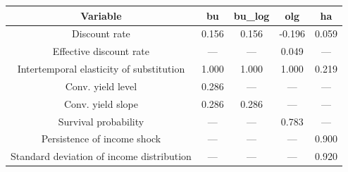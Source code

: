 \begin{table}[!ht]
\setlength\tabcolsep{0.425em}
\setlength\aboverulesep{0pt}
\setlength\belowrulesep{0.2em}
\centering
\begin{threeparttable}
\begin{tabular}{ccccc}
\toprule[0.1em]
Variable & bu & bu\_log & olg & ha \\[0.2em]
\midrule[0.075em]
Discount rate & 0.156 & 0.156 & -0.196 & 0.059 \\[0.2em]
Effective discount rate & --- & --- & 0.049 & --- \\[0.2em]
Intertemporal elasticity of substitution & 1.000 & 1.000 & 1.000 & 0.219 \\[0.2em]
Conv. yield level & 0.286 & --- & --- & --- \\[0.2em]
Conv. yield slope & 0.286 & 0.286 & --- & --- \\[0.2em]
Survival probability & --- & --- & 0.783 & --- \\[0.2em]
Persistence of income shock & --- & --- & --- & 0.900 \\[0.2em]
Standard deviation of income distribution & --- & --- & --- & 0.920 \\[0.2em]
\bottomrule[0.1em]
\end{tabular}
\end{threeparttable}
\end{table}
